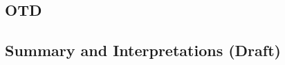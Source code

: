 \documentclass[9pt]{extarticle}
\begin{document}
\subsection{OTD}

\newpage

\subsection{Summary and Interpretations (Draft)}
%
%
%
\end{document}
